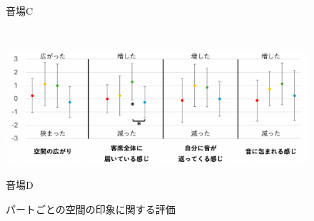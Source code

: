 \documentclass[11pt,a4j]{jreport}
\begin{document}
\begin{figure}[H]
\begin{minipage}{1\linewidth}
      \caption*{音場C}
      \label{fig:空間の印象C}
    \end{minipage}
    \\
    \vspace{1\baselineskip}
    \begin{minipage}{1\linewidth}
      \centering
      \includegraphics[scale=.55]{images/subjectiveExp/statisticAnalysis/part_space_d.pdf}
      \caption*{音場D}
      \label{fig:空間の印象D}
    \end{minipage}
    
    \caption{パートごとの空間の印象に関する評価}
    \label{fig:パートごとの空間の印象に関する評価}
  \end{figure}
\end{document}
